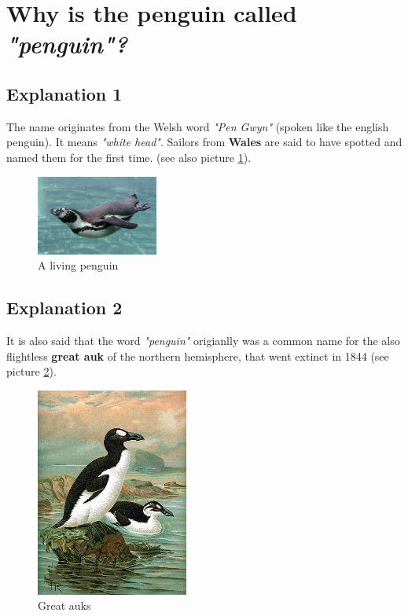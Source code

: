 \documentclass[a4paper, pdftex, english, 11pt]{article}
\begin{document}
\section{Why is the penguin called \emph{"penguin"?}}
\subsection{Explanation 1}
The name originates from the Welsh word \emph{"Pen Gwyn"} (spoken like the english penguin). It means \emph{"white head"}. Sailors from \textbf{Wales} are said to have spotted and named them for the first time. (see also picture \ref{img:pen}).

\begin{figure}[H]
\begin{center}
\includegraphics[width=4cm]{bilder/swim-Ping.jpg}
\caption{A living penguin}
\label{img:pen}
\end{center}
\end{figure}

\subsection{Explanation 2}
It is also said that the word \emph{"penguin"} origianlly was a common name for the also flightless \textbf{great auk} of the northern hemisphere, that went extinct in 1844 (see picture \ref{img:auk}).

\begin{figure}[H]
\begin{center}
\includegraphics[width=5cm]{bilder/GreatAuk.jpg}
\caption{Great auks}
\label{img:auk}
\end{center}
\end{figure}
\end{document}
